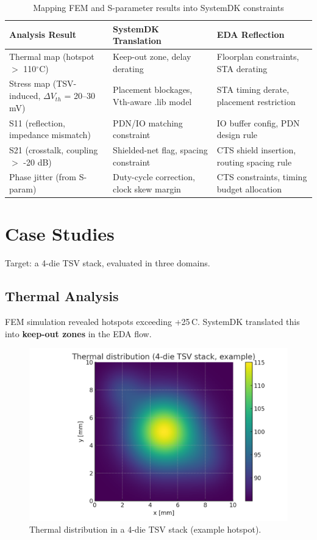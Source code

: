 \documentclass[conference]{IEEEtran}
\begin{document}
\begin{table}[htbp]
\centering
\caption{Mapping FEM and S-parameter results into SystemDK constraints}
\label{tab:constraint_mapping}
\begin{tabular}{|p{2.6cm}|p{3.8cm}|p{3.2cm}|}
\hline
\textbf{Analysis Result} & \textbf{SystemDK Translation} & \textbf{EDA Reflection} \\
\hline
Thermal map (hotspot $>$ 110$^\circ$C) & Keep-out zone, delay derating & Floorplan constraints, STA derating \\
\hline
Stress map (TSV-induced, $\Delta V_{th}$ = 20--30 mV) & Placement blockages, Vth-aware .lib model & STA timing derate, placement restriction \\
\hline
S11 (reflection, impedance mismatch) & PDN/IO matching constraint & IO buffer config, PDN design rule \\
\hline
S21 (crosstalk, coupling $>$ -20 dB) & Shielded-net flag, spacing constraint & CTS shield insertion, routing spacing rule \\
\hline
Phase jitter (from S-param) & Duty-cycle correction, clock skew margin & CTS constraints, timing budget allocation \\
\hline
\end{tabular}
\end{table}

\section{Case Studies}
Target: a 4-die TSV stack, evaluated in three domains.

\subsection{Thermal Analysis}
FEM simulation revealed hotspots exceeding +25\,\textdegree C.
SystemDK translated this into \textbf{keep-out zones} in the EDA flow.

\begin{figure}[htbp]
  \centering
  \includegraphics[width=0.8\linewidth]{thermal_map}
  \caption{Thermal distribution in a 4-die TSV stack (example hotspot).}
  \label{fig:thermal}
\end{figure}
\end{document}
